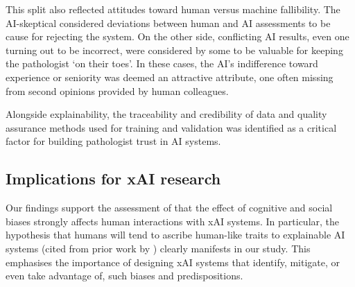 
This split also reflected attitudes toward human versus machine fallibility. The AI-skeptical considered deviations between human and AI assessments to be cause for rejecting the system. On the other side, conflicting AI results, even one turning out to be incorrect, were considered by some to be valuable for keeping the pathologist `on their toes'. In these cases, the AI's indifference toward experience or seniority was deemed an attractive attribute, one often missing from second opinions provided by human colleagues.


Alongside explainability, the traceability and credibility of data and quality assurance methods used for training and validation was identified as a critical factor for building pathologist trust in AI systems.

\subsection{Implications for xAI research}



Our findings support the assessment of \citet{miller2019explanation} that the effect of cognitive and social biases strongly affects human interactions with xAI systems. In particular, the hypothesis that humans will tend to ascribe human-like traits to explainable AI systems (cited from prior work by \citet{de2017people}) clearly manifests in our study. This emphasises the importance of designing xAI systems that identify, mitigate, or even take advantage of, such biases and predispositions.

